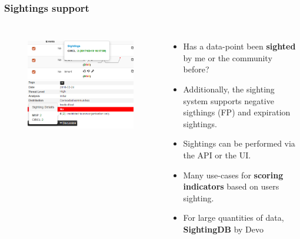 \begin{frame}
        \frametitle{Sightings support}
        \begin{columns}[t]
        \column{5.0cm}
        \begin{figure}
        \includegraphics[scale=0.3]{screenshots/sighting-n.png}\\
        \includegraphics[scale=0.34]{screenshots/Sightings2.PNG}
        \end{figure}
        \column{7cm}
        \begin{itemize}
                \item Has a data-point been {\bf sighted} by me or the community before?
                \item Additionally, the sighting system supports negative sigthings (FP) and expiration sightings.
                \item Sightings can be performed via the API or the UI.
                \item Many use-cases for {\bf scoring indicators} based on users sighting.
                \item For large quantities of data, {\bf SightingDB} by Devo
        \end{itemize}
        \end{columns}
\end{frame}


